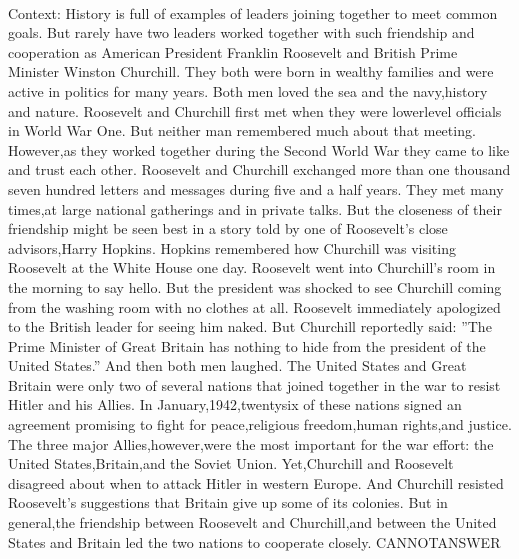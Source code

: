 \documentclass[11pt,a4paper, onecolumn]{article}
\begin{document}
\\ Context: History is full of examples of leaders joining together to meet common goals. But rarely have two leaders worked together with such friendship and cooperation as American President Franklin Roosevelt and British Prime Minister Winston Churchill. They both were born in wealthy families and were active in politics for many years. Both men loved the sea and the navy,history and nature. Roosevelt and Churchill first met when they were lowerlevel officials in World War One. But neither man remembered much about that meeting. However,as they worked together during the Second World War they came to like and trust each other. Roosevelt and Churchill exchanged more than one thousand seven hundred letters and messages during five and a half years. They met many times,at large national gatherings and in private talks. But the closeness of their friendship might be seen best in a story told by one of Roosevelt's close advisors,Harry Hopkins. Hopkins remembered how Churchill was visiting Roosevelt at the White House one day. Roosevelt went into Churchill's room in the morning to say hello. But the president was shocked to see Churchill coming from the washing room with no clothes at all. Roosevelt immediately apologized to the British leader for seeing him naked. But Churchill reportedly said: ''The Prime Minister of Great Britain has nothing to hide from the president of the United States.'' And then both men laughed. The United States and Great Britain were only two of several nations that joined together in the war to resist Hitler and his Allies. In January,1942,twentysix of these nations signed an agreement promising to fight for peace,religious freedom,human rights,and justice. The three major Allies,however,were the most important for the war effort: the United States,Britain,and the Soviet Union. Yet,Churchill and Roosevelt disagreed about when to attack Hitler in western Europe. And Churchill resisted Roosevelt's suggestions that Britain give up some of its colonies. But in general,the friendship between Roosevelt and Churchill,and between the United States and Britain led the two nations to cooperate closely. CANNOTANSWER
\end{document}
